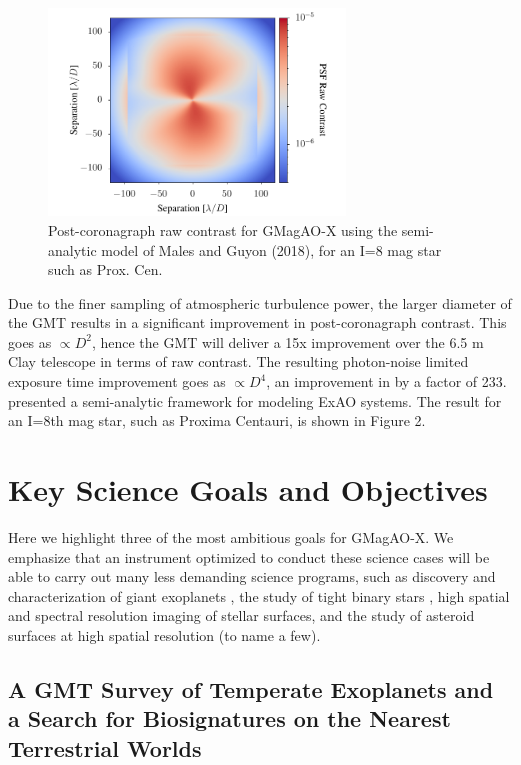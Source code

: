 \documentclass[12pt,preprint]{aastex}
\begin{document}
\begin{figure}
\centering
\vspace{-0.4in}
\includegraphics[width=3.1in]{figures/fig2.pdf}
\vspace{-0.25in}
\caption{ Post-coronagraph raw contrast for GMagAO-X using the semi-analytic model of Males and Guyon (2018), for an I=8 mag star such as Prox. Cen.   \label{fig:contrast} }
\end{figure}

Due to the finer sampling of atmospheric turbulence power, the larger diameter of the GMT results in a significant improvement in post-coronagraph contrast. This goes as $\propto D^2$, hence the GMT will deliver a 15x improvement over the 6.5 m Clay telescope in terms of raw contrast.  The resulting photon-noise limited exposure time improvement goes as $\propto D^4$, an improvement in by a factor of 233.  \citet{2018JATIS...4a9001M} presented a semi-analytic framework for modeling ExAO systems.  The result for an I=8th mag star, such as Proxima Centauri, is shown in Figure 2.

\section{Key Science Goals and Objectives}

Here we highlight three of the most ambitious goals for GMagAO-X.  We emphasize that an instrument optimized to conduct these science cases will be able to carry out many less demanding science programs, such as discovery and characterization of giant exoplanets \citep[Astro2020:][]{2019BAAS...51c.496B,2019BAAS...51c.505B}, the study of tight binary stars \citep[Astro2020:][]{2019BAAS...51c.483S}, high spatial and spectral resolution imaging of stellar surfaces, and the study of asteroid surfaces at high spatial resolution (to name a few).


\subsection{A GMT Survey of Temperate Exoplanets and a Search for Biosignatures on the Nearest Terrestrial Worlds}
\end{document}
